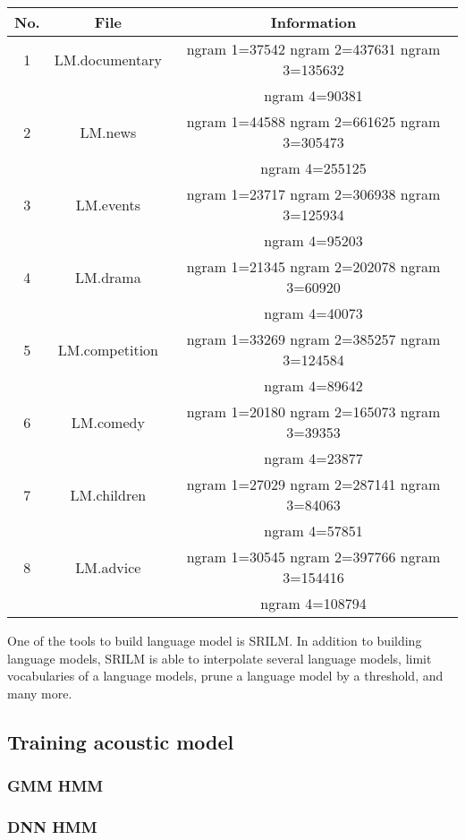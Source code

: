\begin{enumerate}
\begin{center}
\begin{tabular}{ | c | c | c | }
\hline
\textbf{No.} & \textbf{File}  & \textbf{Information} \\ \hline \hline
1 & LM.documentary & ngram 1=37542
ngram 2=437631
ngram 3=135632 \\
& & ngram 4=90381   \\ \hline
2 & LM.news & ngram 1=44588
ngram 2=661625
ngram 3=305473 \\
& & ngram 4=255125  \\ \hline
3 & LM.events & ngram 1=23717
ngram 2=306938
ngram 3=125934 \\
& & ngram 4=95203  \\ \hline
4 & LM.drama & ngram 1=21345
ngram 2=202078
ngram 3=60920 \\
& & ngram 4=40073  \\ \hline
5 & LM.competition &  ngram 1=33269
ngram 2=385257
ngram 3=124584 \\
& & ngram 4=89642 \\ \hline
6 & LM.comedy & ngram 1=20180
ngram 2=165073
ngram 3=39353 \\
& & ngram 4=23877  \\ \hline
7 & LM.children &  ngram 1=27029
ngram 2=287141
ngram 3=84063 \\
& & ngram 4=57851 \\ \hline
8 & LM.advice & ngram 1=30545
ngram 2=397766
ngram 3=154416 \\
& & ngram 4=108794  \\ \hline
\end{tabular}
\end{center}

\end{enumerate}

One of the tools to build language model is SRILM. In addition to building language models, SRILM is able to interpolate several language models, limit vocabularies of a language models, prune a language model by a threshold, and many more.


\subsection{Training acoustic model}
\subsubsection{GMM HMM}


\subsubsection{DNN HMM}

